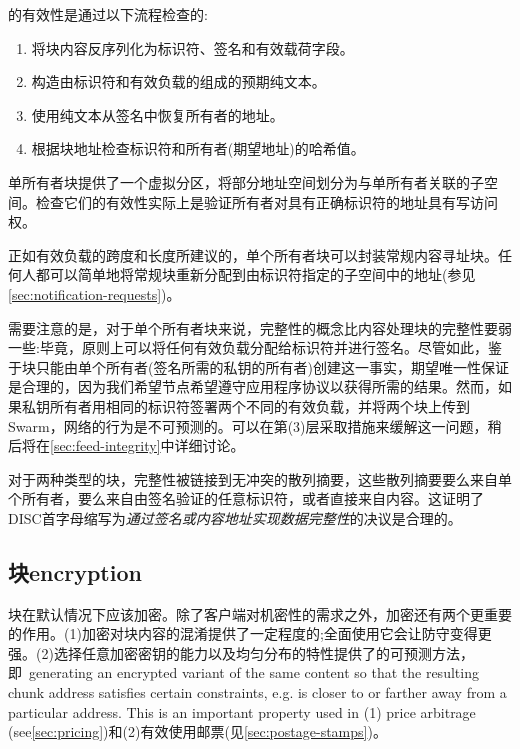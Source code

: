 的有效性是通过以下流程检查的:

\begin{enumerate}
    \item 将块内容反序列化为标识符、签名和有效载荷字段。
    \item 构造由标识符和有效负载的组成的预期纯文本。
    \item 使用纯文本从签名中恢复所有者的地址。
    \item 根据块地址检查标识符和所有者(期望地址)的哈希值。
\end{enumerate}

单所有者块提供了一个虚拟分区，将部分地址空间划分为与单所有者关联的子空间。检查它们的有效性实际上是验证所有者对具有正确标识符的地址具有写访问权。

正如有效负载的跨度和长度所建议的，单个所有者块可以封装常规内容寻址块。任何人都可以简单地将常规块重新分配到由标识符指定的子空间中的地址(参见\ref{sec:notification-requests})。


需要注意的是，对于单个所有者块来说，完整性的概念比内容处理块的完整性要弱一些:毕竟，原则上可以将任何有效负载分配给标识符并进行签名。尽管如此，鉴于块只能由单个所有者(签名所需的私钥的所有者)创建这一事实，期望唯一性保证是合理的，因为我们希望节点希望遵守应用程序协议以获得所需的结果。然而，如果私钥所有者用相同的标识符签署两个不同的有效负载，并将两个块上传到Swarm，网络的行为是不可预测的。可以在第(3)层采取措施来缓解这一问题，稍后将在\ref{sec:feed-integrity}中详细讨论。

对于两种类型的块，完整性被链接到无冲突的散列摘要，这些散列摘要要么来自单个所有者，要么来自由签名验证的任意标识符，或者直接来自内容。这证明了DISC首字母缩写为\emph{通过签名或内容地址实现数据完整性}的决议是合理的。

\subsection{块encryption\statusgreen}\label{sec:chunk-encryption}

块在默认情况下应该加密。除了客户端对机密性的需求之外，加密还有两个更重要的作用。(1)加密对块内容的混淆提供了一定程度的;全面使用它会让防守变得更强。(2)选择任意加密密钥的能力以及均匀分布的特性提供了的可预测方法，即\ generating an encrypted variant of the same content so that the resulting chunk address satisfies certain constraints, e.g. is closer to or farther away from a particular address. This is an important property used in (1) price arbitrage (see\ref{sec:pricing})和(2)有效使用邮票(见\ref{sec:postage-stamps})。


